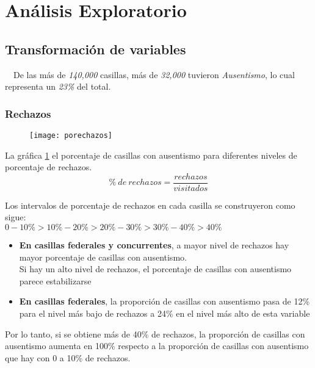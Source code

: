 \documentclass[DIV=calc, 
					paper=letter, 
					fontsize=11pt, 
					twocolumn]{scrartcl}
\begin{document}
\section{An\'alisis Exploratorio}
\subsection{Transformaci\'on de variables}
\vspace{3mm}

~~De las m\'as de \textit{140,000} casillas, m\'as de \textit{32,000} tuvieron \textit{Ausentismo}, lo cual representa un \textit{23\%} del total. 

\subsubsection{Rechazos}

\begin{figure}[H]
\caption{}
\centering
\texttt{[image: porechazos]}
\label{fig:porechazos}
\end{figure}

La gr\'afica \ref{fig:porechazos} el porcentaje de casillas con ausentismo para diferentes niveles de porcentaje de rechazos.\\
\begin{equation*}
\% \ de \ rechazos = \frac{rechazos}{visitados}
\end{equation*}

Los intervalos de porcentaje de rechazos en cada casilla se construyeron como sigue: \\

$0 - 10\% >10\% - 20\% >20\% - 30\%	>30\% - 40\%  >40\%$ \\

\begin{itemize}
\item \textbf{En casillas federales y concurrentes}, a mayor nivel de rechazos hay mayor porcentaje de casillas con ausentismo.\\
Si hay un alto nivel de rechazos, el porcentaje de casillas con ausentismo parece estabilizarse\\
\item \textbf{En casillas federales}, la proporci\'on de casillas con ausentismo pasa de 12\% para el nivel más bajo de rechazos a 24\% en el nivel más alto de esta variable\\
\end{itemize}
Por lo tanto, si se obtiene más de 40\% de rechazos, la proporci\'on de casillas con ausentismo aumenta en 100\% respecto a la proporción de casillas con ausentismo que hay con 0 a 10\% de rechazos.
\end{document}
